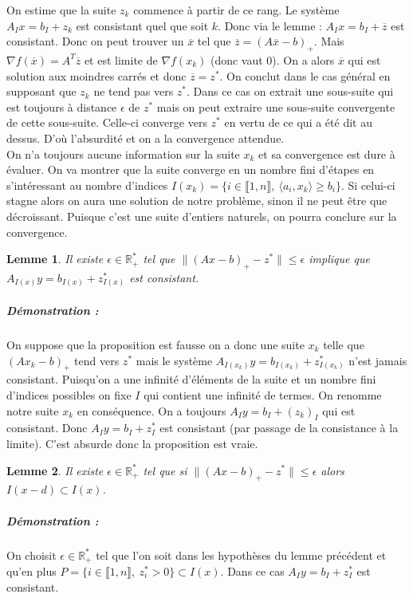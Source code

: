 \documentclass[10pt,a4paper]{article}
\newtheorem{lemma}{Lemme}
\begin{document}
On estime que la suite $z_k$ commence à partir de ce rang.
Le système $A_Ix=b_I+z_k$ est consistant quel que soit $k$.
Donc via le lemme : $A_Ix=b_I+\overline{z}$ est consistant.
Donc on peut trouver un $\overline{x}$ tel que $\overline{z}=(A\overline{x}-b)_+$.
Mais $\nabla f(\overline{x})=A^T \overline{z}$ et est limite de $\nabla f(x_k)$ (donc vaut 0).
On a alors $\overline{x}$ qui est solution aux moindres carrés et donc $\overline{z}=z^*$.
On conclut dans le cas général en supposant que $z_k$ ne tend pas vers $z^*$.
Dans ce cas on extrait une sous-suite qui est toujours à distance $\epsilon$ de $z^*$ mais on peut extraire une sous-suite convergente de cette sous-suite.
Celle-ci converge vers $z^*$ en vertu de ce qui a été dit au dessus.
D'où l'absurdité et on a la convergence attendue.\\
On n'a toujours aucune information sur la suite $x_k$ et sa convergence est dure à évaluer.
On va montrer que la suite converge en un nombre fini d'étapes en s'intéressant au nombre d'indices $I(x_k)=\lbrace i \in \llbracket 1,n \rrbracket, \ \langle a_i,x_k \rangle \ge b_i \rbrace$.
Si celui-ci stagne alors on aura une solution de notre problème, sinon il ne peut être que décroissant.
Puisque c'est une suite d'entiers naturels, on pourra conclure sur la convergence.
\begin{lemma}
Il existe $\epsilon \in \mathbb{R}_+^*$ tel que $\| (Ax-b)_+ -z^* \| \le \epsilon$ implique que $A_{I(x)}y=b_{I(x)}+z_{I(x)}^*$ est consistant.
\end{lemma}
\subparagraph{Démonstration :} On suppose que la proposition est fausse on a donc une suite $x_k$ telle que $(Ax_k-b)_+$ tend vers $z^*$ mais le système $A_{I(x_k)}y=b_{I(x_k)}+z_{I(x_k)}^*$ n'est jamais consistant.
Puisqu'on a une infinité d'éléments de la suite et un nombre fini d'indices possibles on fixe $I$ qui contient une infinité de termes.
On renomme notre suite $x_k$ en conséquence.
On a toujours $A_Iy=b_I+(z_k)_I$ qui est consistant.
Donc $A_Iy=b_I+z^*_I$ est consistant (par passage de la consistance à la limite).
C'est absurde donc la proposition est vraie.
\begin{lemma}
Il existe $\epsilon \in \mathbb{R}_+^*$ tel que si $\| (Ax-b)_+ -z^*\| \le \epsilon$ alors $I(x-d) \subset I(x)$.
\end{lemma}
\subparagraph{Démonstration :} On choisit $\epsilon \in \mathbb{R}_+^*$ tel que l'on soit dans les hypothèses du lemme précédent et qu'en plus $P=\lbrace i \in \llbracket 1,n \rrbracket, \ z_i^* >0 \rbrace \subset I(x)$.
Dans ce cas $A_I y =b_I +z_I^*$ est consistant.
\end{document}
